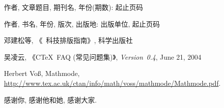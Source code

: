 
\cleardoublepage{}
{}
\CTEXoptions[bibname={\zihao{-2} 攻读硕士学位期间出版或发表的论著、文}]
\begin{thebibliography}{000}

   作者, 文章题目, 期刊名, 年份(期数): 起止页码

   作者, 书名, 年份, 版次, 出版地: 出版单位, 起止页码

   邓建松等, 《\LaTeXe~科技排版指南》, 科学出版社

   吴凌云, 《CTeX~FAQ (常见问题集)》, \textit{Version~0.4}, June 21, 2004

   Herbert Vo\ss, Mathmode, \url{http://www.tex.ac.uk/ctan/info/math/voss/mathmode/Mathmode.pdf}.

\end{thebibliography}
\CTEXoptions[bibname={\xiaoerhao 参考文献}]

\acknowledgement

感谢你, 感谢他和她, 感谢大家.
